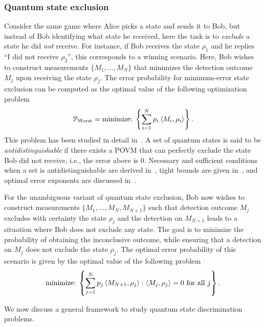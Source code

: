 \subsubsection{Quantum state exclusion} 
Consider the same game where Alice picks a state and sends it to Bob, but instead of Bob identifying what state he received, here the task is to \emph{exclude} a state he did \emph{not} receive.
For instance, if Bob receives the state $\rho_1$ and he replies ``I did not receive $\rho_2$'', this corresponds to a winning scenario.
Here, Bob wishes to construct measurements $\{M_1, \dots, M_N\}$ that minimizes the detection outcome $M_j$ upon receiving the state $\rho_j$. 
The error probability for minimum-error state exclusion can be computed as the optimal value of the following optimization problem 
\begin{align}
    \label{eq:ch3_QSD-ME_SE}
    \mathcal{P}_{\mathrm{Worst}} = \text{minimize:} \; \left\{ \sum_{i=1}^N p_i \left\langle M_i, \rho_i \right\rangle \right\}. 
\end{align}
This problem has been studied in detail in~\cite{bandyopadhyay2014conclusive, uola2020all, ducuara2019operational}.
A set of quantum states is said to be \emph{antidistinguishable} if there exists a POVM that can perfectly exclude the state Bob did not receive, i.e., the error above is $0$. 
Necessary and sufficient conditions when a set is antidistinguishable are derived in~\cite{russo2023inner},  tight bounds are given in~\cite{johnston2023tight}, and optimal error exponents are discussed in~\cite{mishra2023optimal}. 
 
For the unambiguous variant of quantum state exclusion, Bob now wishes to construct measurements $\{M_1, \dots, M_N, M_{N+1}\}$ such that detection outcome $M_j$ excludes with certainty the state $\rho_j$ and the detection on $M_{N+1}$ leads to a situation where Bob does not exclude any state. 
The goal is to minimize the probability of obtaining the inconclusive outcome, while ensuring that a detection on $M_j$ does not exclude the state $\rho_j$.
The optimal error probability of this scenario is given by the optimal value of the following problem 
\begin{align}
    \label{eq:ch3_QSD-UA_SE}
    \text{minimize:} \; \left\{ \sum_{j=1}^N p_j \left\langle M_{N+1}, \rho_j \right\rangle : \left\langle M_j, \rho_j \right\rangle = 0 \text{ for all } j \right\}. 
\end{align}

We now discuss a general framework to study quantum state discrimination problems.

